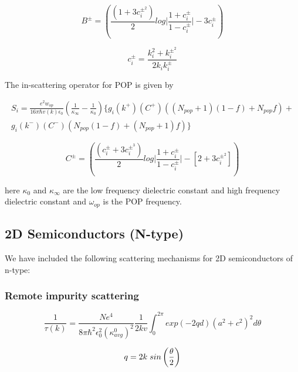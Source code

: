 \documentclass[12pt]{article}
\begin{document}
\begin{equation}
B^{\pm} = \left( \frac{(1+3c_i^{\pm^2})}{2} log\Bigg| \frac{1+c_i^{\pm}}{1-c_i^{\pm}} \Bigg| - 3c_i^{\pm}\right) 
\label{B_pm}
\end{equation}

\begin{equation}
c_i^{\pm} =  \frac{k_i^2 + k_i^{\pm^2}} {2k_i k_i^{\pm} } 
\label{c_i}
\end{equation}

The in-scattering operator for POP is given by \cite{ramu2011thermoelectric}

\begin{multline}
    S_i = \frac{e^2 w_{op}}{16\pi \hbar v(k) \epsilon_0}  \left( \frac{1}{\kappa_\infty} - \frac{1}{\kappa_0} \right) \{ g_i(k^+) (C^+)  \left( (N_{pop}+1)(1-f) + N_{pop} f \right) + \\ g_i(k^-) (C^-) \left( N_{pop}(1-f) + (N_{pop}+1) f \right) \}
\label{Si_p}
\end{multline}

\begin{equation}
C^{\pm} = \left( \frac{(c_i^{\pm}+3c_i^{\pm^3})}{2} log \Bigg|  \frac{1+c_i^{\pm}}{1-c_i^{\pm}}\Bigg|  - \left[ 2 + 3c_i^{\pm^2} \right] \right) 
\label{C_pm}
\end{equation}

here $\kappa_0$ and $\kappa_{\infty}$ are the low frequency dielectric constant and high frequency dielectric constant and $\omega_{op}$ is the POP frequency.

\subsection{2D Semiconductors (N-type)}
We have included the following scattering mechanisms for 2D semiconductors of n-type: 

\subsubsection{Remote impurity scattering}
\begin{equation}
\frac{1}{\tau(k)} = \frac{N e^4}{8 \pi \hbar^2 \epsilon_0^2 (\kappa_{avg}^{0})^2} \frac{1}{2kv} \int_0^{2\pi} exp(-2qd) (a^2 + c^2)^2 d\theta
    \label{ii_2d}
\end{equation}

\begin{equation}
q = 2 k \hspace{0.1cm} sin \left( \frac{\theta}{2} \right)
\label{change}
\end{equation}
\end{document}
